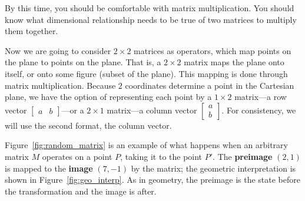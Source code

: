 \documentclass[../textbook.tex]{subfiles}
\begin{document}
\noindent By this time, you should be comfortable with matrix multiplication. You should know what dimensional relationship needs to be true of two matrices to multiply them together.

Now we are going to consider $2\times 2$ matrices as operators, which map points on the plane to points on the plane. That is, a $2\times 2$ matrix maps the plane onto itself, or onto some figure (subset of the plane). This mapping is done through matrix multiplication. Because $2$ coordinates determine a point in the Cartesian plane, we have the option of representing each point by a $1\times 2$ matrix---a row vector $\left[\begin{array}{cc}a & b \end{array}\right]$---or a $2\times 1$ matrix---a column vector $\left[\begin{array}{c}a \\ b \end{array}\right]$. For consistency, we will use the second format, the column vector.

Figure~\ref{fig:random_matrix} is an example of what happens when an arbitrary matrix $M$ operates on a point $P$, taking it to the point $P'$. The \textbf{preimage} $(2,1)$ is mapped to the \textbf{image} $(7, -1)$ by the matrix; the geometric interpretation is shown in Figure~\ref{fig:geo_interp}. As in geometry, the preimage is the state before the transformation and the image is after.
\end{document}
